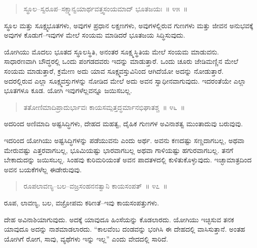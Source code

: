 \vspace{-0.3cm}

\begin{verse}
ಸ್ಥೂಲ–ಸ್ವರೂಪ–ಸಕ್ಷ್ಮಾನ್ವಯಾರ್ಥವತ್ತ್ವಸಂಯಮಾದ್​ ಭೂತಜಯಃ~॥ ೪೫~॥
\end{verse}

\vspace{-0.3cm}

ಸ್ಥೂಲ ಮತ್ತು ಸೂಕ್ಷ್ಮಭೂತಗಳು, ಅವುಗಳ ಪ್ರಧಾನ ಲಕ್ಷಣಗಳು, ಅವುಗಳಲ್ಲಿರುವ ಗುಣಗಳು ಮತ್ತು ಜೀವನ ಅನುಭವಕ್ಕೆ ಅವುಗಳ ಕೊಡುಗೆ–ಇವುಗಳ ಮೇಲೆ ಸಂಯಮ ಮಾಡಿದರೆ ಭೂತಜಯ ಸಿದ್ಧಿಸುವುದು. 

ಯೋಗಿಯು ಮೊದಲು ಭೂತದ ಸ್ಥೂಲಸ್ಥಿತಿ, ಅನಂತರ ಸೂಕ್ಷ್ಮಸ್ಥಿತಿಯ ಮೇಲೆ ಸಂಯಮ ಮಾಡುವನು. ಸಾಧಾರಣವಾಗಿ ಬೌದ್ಧರಲ್ಲಿ ಒಂದು ಪಂಗಡದವರು ಇದನ್ನು ಮಾಡುತ್ತಾರೆ. ಒಂದು ಚೂರು ಜೇಡಿಮಣ್ಣಿನ ಮೇಲೆ ಸಂಯಮ ಮಾಡುತ್ತಾರೆ, ಕ್ರಮೇಣ ಅದು ಯಾವ ಸೂಕ್ಷ್ಮವಸ್ತುವಿನಿಂದ ಆಗಿದೆಯೋ ಅದನ್ನು ನೋಡುತ್ತಾರೆ. ಅದರಲ್ಲಿರುವ ಎಲ್ಲಾ ಸೂಕ್ಷ್ಮವಸ್ತುಗಳನ್ನು ನೋಡಿದ ಮೇಲೆ ಅದು ಅವನ ಸ್ವಾಧೀನವಾಗುವುದು. ಇದರಂತೆಯೇ ಎಲ್ಲಾ ಭೂತಗಳೂ ಕೂಡ. ಯೋಗಿ ಇವುಗಳೆಲ್ಲವನ್ನೂ ಜಯಿಸಬಲ್ಲ. 

\vspace{-0.3cm}

\begin{verse}
ತತೋಣಿಮಾದಿಪ್ರಾದುರ್ಭಾವಃ ಕಾಯಸಮ್ಪತ್ತದ್ಧರ್ಮಾನಭಿಘಾತಶ್ಚ~॥ ೪೬~॥
\end{verse}

\vspace{-0.3cm}

ಅದರಿಂದ ಅಣಿಮಾದಿ ಅಷ್ಟಸಿದ್ಧಿಗಳು, ದೇಹದ ಮಹತ್ವ, ದೈಹಿಕ ಗುಣಗಳ ಅವಿನಾಶತ್ವ ಮುಂತಾದುವು ಬರುವುವು. 

ಇದರಿಂದ ಯೋಗಿಯು ಅಷ್ಟಸಿದ್ಧಿಗಳನ್ನು ಪಡೆಯುವನು ಎಂದು ಅರ್ಥ. ಅವನು ಕಣದಷ್ಟು ಸಣ್ಣದಾಗಬಲ್ಲ, ಅಥವಾ ಮೇರುವಷ್ಟು ಎತ್ತರವಾಗಬಲ್ಲ, ಭೂಮಿಯಷ್ಟು ಭಾರವಾಗಬಲ್ಲ ಅಥವಾ ಗಾಳಿಯಷ್ಟು ಹಗುರವಾಗಬಲ್ಲ. ತನಗೆ ಬೇಕಾದುದನ್ನು ಜಯಿಸಬಲ್ಲ. ಸಿಂಹವು ಕುರಿಮರಿಯಂತೆ ಅವನ ಪಾದತಳದಲ್ಲಿ ಕುಳಿತುಕೊಳ್ಳುವುದು. ಇಚ್ಛಾಮಾತ್ರದಿಂದ ಅವನ ಬಯಕೆಗಳೆಲ್ಲ ಈಡೇರುವುವು. 

\vspace{-0.3cm}

\begin{verse}
ರೂಪಲಾವಣ್ಯ–ಬಲ–ವಜ್ರಸಂಹನನತ್ವಾನಿ ಕಾಯಸಂಪತ್​~॥ ೪೭~॥
\end{verse}

\vspace{-0.3cm}

ರೂಪ, ಲಾವಣ್ಯ, ಬಲ, ವಜ್ರೋಪಮ ಕಠಿಣತೆ–ಇವು ಕಾಯಸಂಪತ್ತುಗಳು. 

ದೇಹ ಅವಿನಾಶಿಯಾಗುವುದು. ಅದಕ್ಕೆ ಯಾವುದೂ ಹಿಂಸೆಯನ್ನು ಕೊಡಲಾರದು. ಯೋಗಿಯು ಇಚ್ಛಿಸುವ ತನಕ ಯಾವುದೂ ಅದನ್ನು ನಾಶಮಾಡಲಾರದು. “ಕಾಲವೆಂಬ ದಂಡವನ್ನು ಭಂಗಿಸಿ ಈ ದೇಹದಲ್ಲಿ ವಾಸಿಸುತ್ತಾನೆ. ಅಂತಹ ಯೋಗಿಗೆ ರೋಗ, ಸಾವು, ವ್ಯಥೆಗಳು ಇನ್ನು ಇಲ್ಲ” ಎಂದು ವೇದದಲ್ಲಿ ಸಾರಿದೆ. 

\vspace{-0.3cm}

